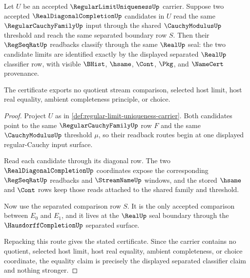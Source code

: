 \begin{theorem}
\label{thm:regular-limit-uniqueness-separated-limit-certificate}
Let $U$ be an accepted $\RegularLimitUniquenessUp$ carrier. Suppose two accepted $\RealDiagonalCompletionUp$ candidates in $U$ read the same $\RegularCauchyFamilyUp$ input through the shared $\CauchyModulusUp$ threshold and reach the same separated boundary row $S$. Then their $\RegSeqRatUp$ readbacks classify through the same $\RealUp$ seal: the two candidate limits are identified exactly by the displayed separated $\RealUp$ classifier row, with visible $\BHist$, $\hsame$, $\Cont$, $\Pkg$, and $\NameCert$ provenance.

The certificate exports no quotient stream comparison, selected host limit, host real equality, ambient completeness principle, or choice.
\end{theorem}
\begin{proof}
Project $U$ as in \autoref{def:regular-limit-uniqueness-carrier}. Both candidates point to the same $\RegularCauchyFamilyUp$ row $F$ and the same $\CauchyModulusUp$ threshold $\mu$, so their readback routes begin at one displayed regular-Cauchy input surface.

Read each candidate through its diagonal row. The two $\RealDiagonalCompletionUp$ coordinates expose the corresponding $\RegSeqRatUp$ readbacks and $\StreamNameUp$ windows, and the stored $\hsame$ and $\Cont$ rows keep those reads attached to the shared family and threshold.

Now use the separated comparison row $S$. It is the only accepted comparison between $E_0$ and $E_1$, and it lives at the $\RealUp$ seal boundary through the $\HausdorffCompletionUp$ separated surface.

Repacking this route gives the stated certificate. Since the carrier contains no quotient, selected host limit, host real equality, ambient completeness, or choice coordinate, the equality claim is precisely the displayed separated classifier claim and nothing stronger.
\end{proof}

